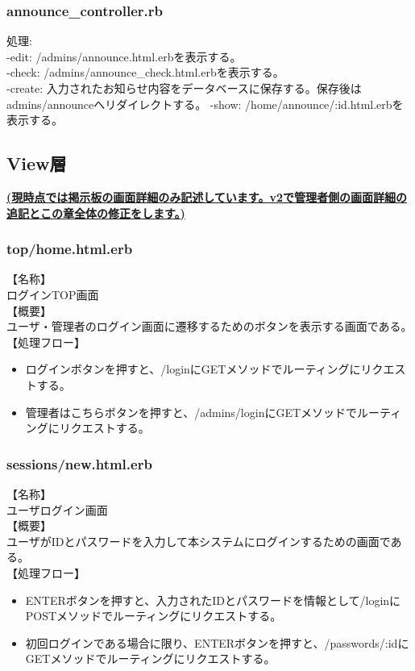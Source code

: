 \documentclass[a4j]{jarticle}
\begin{document}
\subsubsection{announce\_controller.rb}
\noindent
処理:  \\
-edit: /admins/announce.html.erbを表示する。\\
-check: /admins/announce\_check.html.erbを表示する。\\
-create: 入力されたお知らせ内容をデータベースに保存する。保存後はadmins/announceへリダイレクトする。
-show: /home/announce/:id.html.erbを表示する。










\subsection{View層}
\underline{\bf (現時点では掲示板の画面詳細のみ記述しています。v2で管理者側の画面詳細の追記とこの章全体の修正をします。)}\\

\subsubsection{top/home.html.erb}
\noindent
【名称】\\
ログインTOP画面\\
【概要】\\
ユーザ・管理者のログイン画面に遷移するためのボタンを表示する画面である。\\
【処理フロー】
\begin{itemize}
  \item ログインボタンを押すと、/loginにGETメソッドでルーティングにリクエストする。
  \item 管理者はこちらボタンを押すと、/admins/loginにGETメソッドでルーティングにリクエストする。
\end{itemize}

\subsubsection{sessions/new.html.erb}
\noindent
【名称】\\
ユーザログイン画面\\
【概要】\\
ユーザがIDとパスワードを入力して本システムにログインするための画面である。\\
【処理フロー】
\begin{itemize}
  \item ENTERボタンを押すと、入力されたIDとパスワードを情報として/loginにPOSTメソッドでルーティングにリクエストする。
  \item 初回ログインである場合に限り、ENTERボタンを押すと、/passwords/:idにGETメソッドでルーティングにリクエストする。
\end{itemize}
\end{document}
